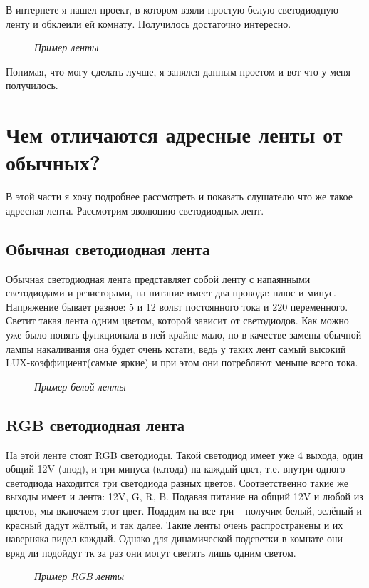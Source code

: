 \documentclass[a4paper, 12pt]{article}
\newcommand{\image}[3]{\begin{figure}[h!]\center{\texttt{[image: \#1]} }\caption{\textit{#3}}\end{figure}}
\begin{document}
В интернете я нашел проект, в котором взяли простую белую светодиодную ленту 
и обклеили ей комнату. Получилось достаточно интересно.

\image{белая_лента.jpg}{300}{Пример ленты}

Понимая, что могу сделать лучше, я занялся данным проетом и вот что у меня 
получилось.

\newpage

\section{Чем отличаются адресные ленты от обычных?}
В этой части я хочу подробнее рассмотреть и показать слушателю что же такое 
адресная лента. Рассмотрим эволюцию светодиодных лент.

\subsection{Обычная светодиодная лента}
Обычная светодиодная лента представляет собой ленту с напаянными светодиодами и
резисторами, на питание имеет два провода: плюс и минус. Напряжение бывает 
разное: 5 и 12 вольт постоянного тока и 220 переменного. Светит такая лента 
одним цветом, которой зависит от светодиодов. Как можно уже было понять 
функционала в ней крайне мало, но в качестве замены обычной лампы накаливания 
она будет очень кстати, ведь у таких лент самый высокий LUX-коэффициент(самые 
яркие) и при этом они потребляют меньше всего тока.

\image{белая_светодиодная_лента.jpg}{350}{Пример белой ленты}

\newpage

\subsection{RGB светодиодная лента}
На этой ленте стоят RGB светодиоды. Такой светодиод имеет уже 4 выхода, один 
общий 12V (анод), и три минуса (катода) на каждый цвет, т.е. внутри одного 
светодиода находится три светодиода разных цветов. Соответственно такие же 
выходы имеет и лента: 12V, G, R, B. Подавая питание на общий 12V и любой из 
цветов, мы включаем этот цвет. Подадим на все три – получим белый, зелёный и 
красный дадут жёлтый, и так далее. Такие ленты очень распространены и их 
наверняка видел каждый. Однако для динамической подсветки в комнате они вряд ли
подойдут тк за раз они могут светить лишь одним светом.

\image{RGB_светодиодная_лента.jpg}{450}{Пример RGB ленты}
\end{document}
